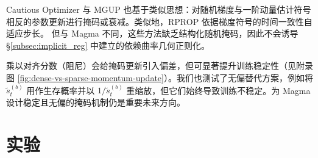 \documentclass[11pt, a4paper, twocolumn, copyright, goog]{google}
\theoremstyle{plain}
\theoremstyle{definition}
\theoremstyle{remark}
\begin{document}
Cautious Optimizer \citep{liang2024cautious} 与 MGUP \citep{chang2025mgup} 也基于类似思想：对随机梯度与一阶动量估计符号相反的参数更新进行掩码或衰减。类似地，RPROP \citep{riedmiller1993direct} 依据梯度符号的时间一致性自适应步长。
但与 Magma 不同，这些方法缺乏结构化随机掩码，因此不会诱导 \S \ref{subsec:implicit_reg} 中建立的依赖曲率几何正则化。 


乘以对齐分数（阻尼）会给掩码更新引入偏差，但可显著提升训练稳定性（见附录图 \ref{fig:dense-vs-sparse-momentum-update}）。我们也测试了无偏替代方案，例如将 $\tilde{s}_t^{(b)}$ 用作生存概率并以 $1/\tilde{s}_t^{(b)}$ 重缩放，但它们始终导致训练不稳定。为 Magma 设计稳定且无偏的掩码机制仍是重要未来方向。




\section{实验}
\end{document}
